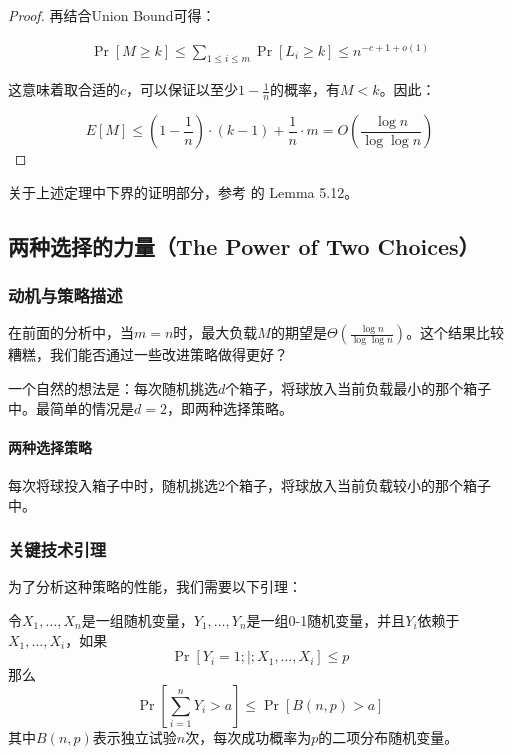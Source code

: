 \documentclass[lang=cn,newtx,10pt,scheme=chinese,chinesefont=nofont,citestyle=gb7714-2015, bibstyle=gb7714-2015]{elegantbook}
\begin{document}
\begin{refsection}
\begin{proof}
再结合Union Bound可得：

\begin{align*}
\Pr[M\ge k] \le \sum_{1\le i\le m}\Pr[L_i\ge k]\le n^{-c+1+o(1)}
\end{align*}

这意味着取合适的$c$，可以保证以至少$1-\frac{1}{n}$的概率，有$M<k$。因此：

\begin{equation*}
E[M] \le \left(1-\frac{1}{n}\right)\cdot(k-1) + \frac{1}{n}\cdot m = O\left(\frac{\log n}{\log\log n}\right)
\end{equation*}
\end{proof}

关于上述定理中下界的证明部分，参考\cite{PCRAPA} 的 Lemma 5.12。

\subsection{两种选择的力量（The Power of Two Choices）}

\subsubsection{动机与策略描述}

在前面的分析中，当$m=n$时，最大负载$M$的期望是$\Theta(\frac{\log n}{\log\log n})$。这个结果比较糟糕，我们能否通过一些改进策略做得更好？

一个自然的想法是：每次随机挑选$d$个箱子，将球放入当前负载最小的那个箱子中。最简单的情况是$d=2$，即两种选择策略。

\paragraph*{两种选择策略}
每次将球投入箱子中时，随机挑选2个箱子，将球放入当前负载较小的那个箱子中。

\subsubsection{关键技术引理}

为了分析这种策略的性能，我们需要以下引理：

\begin{lemma}\label{lemma_Binomial}
令$X_1,\dots,X_n$是一组随机变量，$Y_1,\dots,Y_n$是一组0-1随机变量，并且$Y_i$依赖于$X_1,\dots,X_i$，如果
\begin{equation*}
\Pr[Y_i=1 ;|; X_1,\dots,X_i] \le p
\end{equation*}
那么
\begin{equation*}
\Pr\left[\sum_{i=1}^n Y_i > a\right] \le \Pr[B(n, p) > a]
\end{equation*}
其中$B(n,p)$表示独立试验$n$次，每次成功概率为$p$的二项分布随机变量。
\end{lemma}


\end{refsection}
\end{document}
